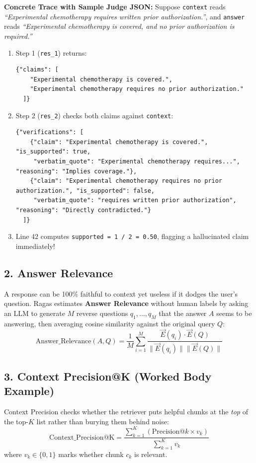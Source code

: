\textbf{Concrete Trace with Sample Judge JSON:} Suppose \texttt{context} reads \emph{``Experimental chemotherapy requires written prior authorization.''}, and \texttt{answer} reads \emph{``Experimental chemotherapy is covered, and no prior authorization is required.''}
\begin{enumerate}[leftmargin=18pt]
  \item Step 1 (\texttt{res\_1}) returns:
  \begin{lstlisting}[basicstyle=\ttfamily\scriptsize]
  {"claims": [
    "Experimental chemotherapy is covered.",
    "Experimental chemotherapy requires no prior authorization."
  ]}
  \end{lstlisting}
  \item Step 2 (\texttt{res\_2}) checks both claims against \texttt{context}:
  \begin{lstlisting}[basicstyle=\ttfamily\scriptsize]
  {"verifications": [
    {"claim": "Experimental chemotherapy is covered.", "is_supported": true,
     "verbatim_quote": "Experimental chemotherapy requires...", "reasoning": "Implies coverage."},
    {"claim": "Experimental chemotherapy requires no prior authorization.", "is_supported": false,
     "verbatim_quote": "requires written prior authorization", "reasoning": "Directly contradicted."}
  ]}
  \end{lstlisting}
  \item Line 42 computes \texttt{supported = 1 / 2 = 0.50}, flagging a hallucinated claim immediately!
\end{enumerate}

\subsection{2. Answer Relevance}
A response can be 100\% faithful to context yet useless if it dodges the user's question. Ragas estimates \textbf{Answer Relevance} without human labels by asking an LLM to generate $M$ reverse questions $q_1, \dots, q_M$ that the answer $A$ seems to be answering, then averaging cosine similarity against the original query $Q$:
\begin{equation}
\text{Answer\_Relevance}(A, Q) = \frac{1}{M} \sum_{i=1}^M \frac{\vec{E}(q_i) \cdot \vec{E}(Q)}{\|\vec{E}(q_i)\| \|\vec{E}(Q)\|}
\end{equation}

\subsection{3. Context Precision@K (Worked Body Example)}
Context Precision checks whether the retriever puts helpful chunks at the \emph{top} of the top-$K$ list rather than burying them behind noise:
\begin{equation}
\text{Context\_Precision@K} = \frac{\sum_{k=1}^K (\text{Precision@}k \times v_k)}{\sum_{k=1}^K v_k}
\end{equation}
where $v_k \in \{0, 1\}$ marks whether chunk $c_k$ is relevant.

